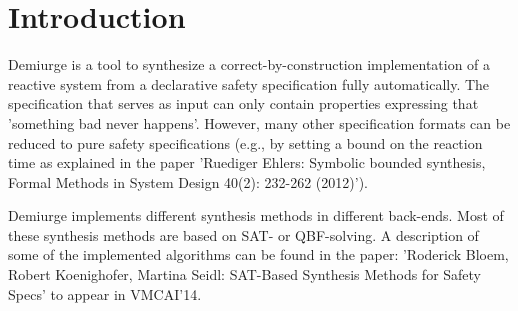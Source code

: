 \hypertarget{index_intro_sec}{}\section{Introduction}\label{index_intro_sec}
Demiurge is a tool to synthesize a correct-\/by-\/construction implementation of a reactive system from a declarative safety specification fully automatically. The specification that serves as input can only contain properties expressing that 'something bad never happens'. However, many other specification formats can be reduced to pure safety specifications (e.\-g., by setting a bound on the reaction time as explained in the paper 'Ruediger Ehlers\-: Symbolic bounded synthesis, Formal Methods in System Design 40(2)\-: 232-\/262 (2012)').

Demiurge implements different synthesis methods in different back-\/ends. Most of these synthesis methods are based on S\-A\-T-\/ or Q\-B\-F-\/solving. A description of some of the implemented algorithms can be found in the paper\-: 'Roderick Bloem, Robert Koenighofer, Martina Seidl\-: S\-A\-T-\/\-Based Synthesis Methods for Safety Specs' to appear in V\-M\-C\-A\-I'14.

